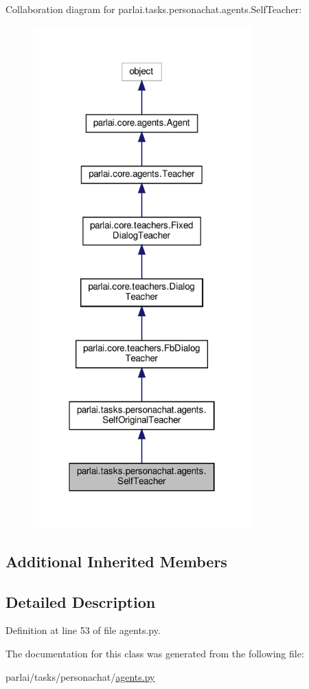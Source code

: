 Collaboration diagram for parlai.\+tasks.\+personachat.\+agents.\+Self\+Teacher\+:
\nopagebreak
\begin{figure}[H]
\begin{center}
\leavevmode
\includegraphics[width=238pt]{d7/d6d/classparlai_1_1tasks_1_1personachat_1_1agents_1_1SelfTeacher__coll__graph}
\end{center}
\end{figure}
\subsection*{Additional Inherited Members}


\subsection{Detailed Description}


Definition at line 53 of file agents.\+py.



The documentation for this class was generated from the following file\+:\begin{DoxyCompactItemize}
\item 
parlai/tasks/personachat/\hyperlink{parlai_2tasks_2personachat_2agents_8py}{agents.\+py}\end{DoxyCompactItemize}
